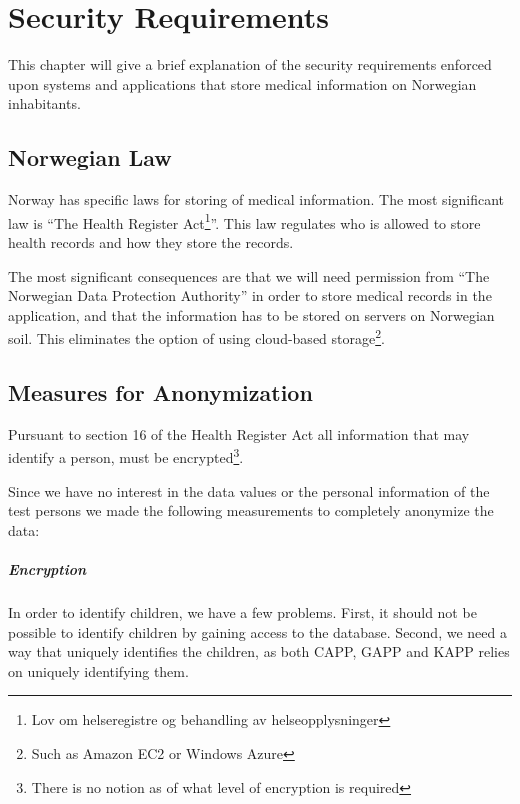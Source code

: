\chapter{Security Requirements}
\label{chp:securityrequirements}

This chapter will give a brief explanation of the security requirements enforced upon systems and applications that store medical information on Norwegian inhabitants. 


\section{Norwegian Law}
\label{sec:helseregisterloven}

Norway has specific laws for storing of medical information. The most significant law is ``The Health Register Act\footnote{Lov om helseregistre og behandling av helseopplysninger}''\cite{helseregisterloven}. This law regulates who is allowed to store health records and how they store the records. 

The most significant consequences are that we will need permission from ``The Norwegian Data Protection Authority'' in order to store medical records in the application, and that the information has to be stored on servers on Norwegian soil. This eliminates the option of using cloud-based storage\footnote{Such as Amazon EC2 or Windows Azure}. 


\section{Measures for Anonymization}
Pursuant to section 16 of the Health Register Act \cite{helseregisterloven} all information that may identify a person, must be encrypted\footnote{There is no notion as of what level of encryption is required}. 

Since we have no interest in the data values or the personal information of the test persons we made the following measurements to completely anonymize the data:

\paragraph{Encryption}
In order to identify children, we have a few problems. First, it should not be possible to identify children by gaining access to the database. Second, we need a way that uniquely identifies the children, as both CAPP, GAPP and KAPP relies on uniquely identifying them. 

